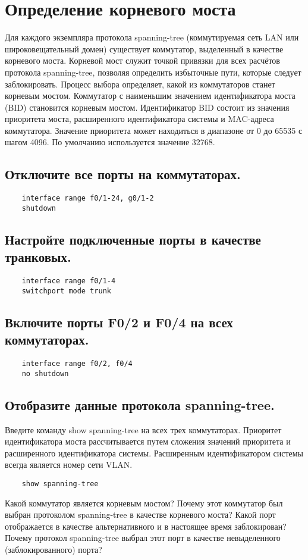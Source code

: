 \section{Определение корневого моста}
Для каждого экземпляра протокола spanning-tree (коммутируемая сеть LAN или широковещательный
домен) существует коммутатор, выделенный в качестве корневого моста.
Корневой мост служит точкой привязки для всех расчётов протокола spanning-tree, позволяя определить избыточные пути,
которые следует заблокировать.
Процесс выбора определяет, какой из коммутаторов станет корневым мостом.
Коммутатор с наименьшим значением идентификатора моста (BID) становится корневым мостом.
Идентификатор BID состоит из значения приоритета моста, расширенного идентификатора системы и MAC-адреса коммутатора.
Значение приоритета может находиться в диапазоне от 0 до 65535 с шагом 4096.
По умолчанию используется значение 32768.


\subsection{Отключите все порты на коммутаторах.}
\begin{verbatim}
    interface range f0/1-24, g0/1-2
    shutdown
\end{verbatim}

\subsection{Настройте подключенные порты в качестве транковых.}
\begin{verbatim}
    interface range f0/1-4
    switchport mode trunk
\end{verbatim}

\subsection{Включите порты F0/2 и F0/4 на всех коммутаторах.}
\begin{verbatim}
    interface range f0/2, f0/4
    no shutdown
\end{verbatim}

\subsection{Отобразите данные протокола spanning-tree.}
Введите команду show spanning-tree на всех трех коммутаторах.
Приоритет идентификатора моста рассчитывается путем сложения значений приоритета и расширенного идентификатора системы.
Расширенным идентификатором системы всегда является номер сети VLAN\@.

\begin{verbatim}
    show spanning-tree
\end{verbatim}

Какой коммутатор является корневым мостом?
Почему этот коммутатор был выбран протоколом spanning-tree в качестве корневого моста?
Какой порт отображается в качестве альтернативного и в настоящее время заблокирован?
Почему протокол spanning-tree выбрал этот порт в качестве невыделенного (заблокированного) порта?
